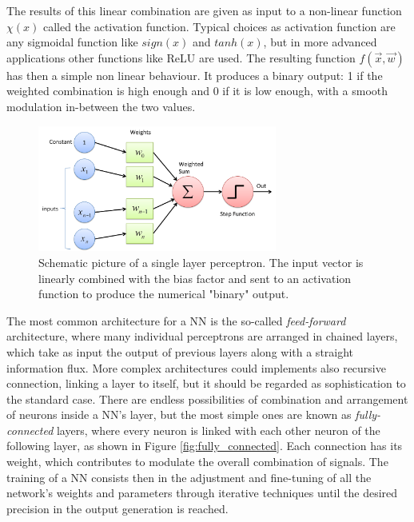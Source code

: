 The results of this linear combination are given as input to a non-linear function $\chi(x)$ called the activation function. Typical choices as activation function are any sigmoidal function like $sign(x)$ and $tanh(x)$, but in more advanced applications other functions like ReLU \cite{1803.08375} are used. The resulting function $f(\vec{x},\vec{w})$ has then a simple non linear behaviour. It produces a binary output: 1 if the weighted combination is high enough and 0 if it is low enough, with a smooth modulation in-between the two values.

\begin{figure}
    \centering
    \includegraphics[width = 0.7\textwidth]{images/perceptron}
    \caption{Schematic picture of a single layer perceptron. The input vector is linearly combined with the bias factor and sent to an activation function to produce the numerical "binary" output.}
    \label{fig:perceptron}
\end{figure}

The most common architecture for a NN is the so-called \textit{feed-forward} architecture, where many individual perceptrons are arranged in chained layers, which take as input the output of previous layers along with a straight information flux. More complex architectures could implements also recursive connection, linking a layer to itself, but it should be regarded as sophistication to the standard case. There are endless possibilities of combination and arrangement of neurons inside a NN's layer, but the most simple ones are known as \textit{fully-connected} layers, where every neuron is linked with each other neuron of the following layer, as shown in Figure \ref{fig:fully_connected}. Each connection has its weight, which contributes to modulate the overall combination of signals. The training of a NN consists then in the adjustment and fine-tuning of all the network's weights and parameters through iterative techniques until the desired precision in the output generation is reached.

